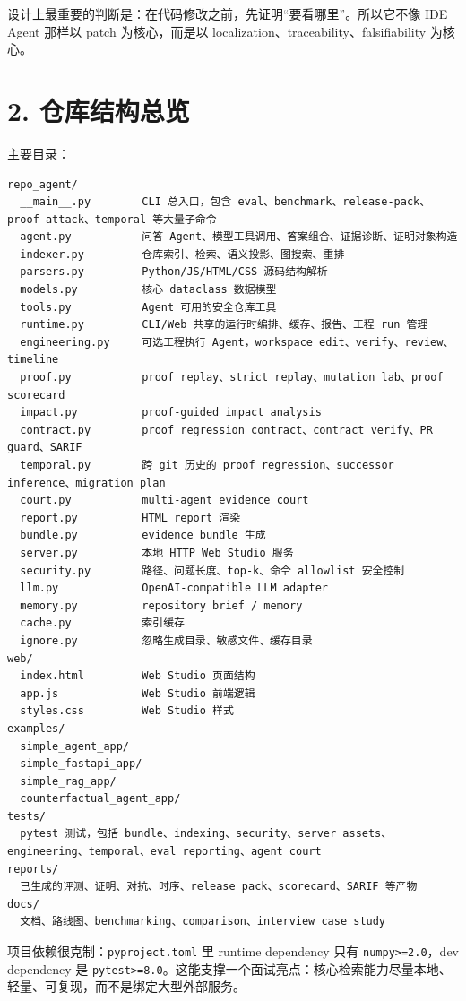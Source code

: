 \documentclass[UTF8,12pt,openany]{ctexbook}
\begin{document}
设计上最重要的判断是：在代码修改之前，先证明“要看哪里”。所以它不像 IDE Agent 那样以 patch 为核心，而是以 localization、traceability、falsifiability 为核心。\par

\section{2. 仓库结构总览}

主要目录：\par

\begin{lstlisting}
repo_agent/
  __main__.py        CLI 总入口，包含 eval、benchmark、release-pack、proof-attack、temporal 等大量子命令
  agent.py           问答 Agent、模型工具调用、答案组合、证据诊断、证明对象构造
  indexer.py         仓库索引、检索、语义投影、图搜索、重排
  parsers.py         Python/JS/HTML/CSS 源码结构解析
  models.py          核心 dataclass 数据模型
  tools.py           Agent 可用的安全仓库工具
  runtime.py         CLI/Web 共享的运行时编排、缓存、报告、工程 run 管理
  engineering.py     可选工程执行 Agent，workspace edit、verify、review、timeline
  proof.py           proof replay、strict replay、mutation lab、proof scorecard
  impact.py          proof-guided impact analysis
  contract.py        proof regression contract、contract verify、PR guard、SARIF
  temporal.py        跨 git 历史的 proof regression、successor inference、migration plan
  court.py           multi-agent evidence court
  report.py          HTML report 渲染
  bundle.py          evidence bundle 生成
  server.py          本地 HTTP Web Studio 服务
  security.py        路径、问题长度、top-k、命令 allowlist 安全控制
  llm.py             OpenAI-compatible LLM adapter
  memory.py          repository brief / memory
  cache.py           索引缓存
  ignore.py          忽略生成目录、敏感文件、缓存目录
web/
  index.html         Web Studio 页面结构
  app.js             Web Studio 前端逻辑
  styles.css         Web Studio 样式
examples/
  simple_agent_app/
  simple_fastapi_app/
  simple_rag_app/
  counterfactual_agent_app/
tests/
  pytest 测试，包括 bundle、indexing、security、server assets、engineering、temporal、eval reporting、agent court
reports/
  已生成的评测、证明、对抗、时序、release pack、scorecard、SARIF 等产物
docs/
  文档、路线图、benchmarking、comparison、interview case study
\end{lstlisting}

项目依赖很克制：\texttt{pyproject.toml} 里 runtime dependency 只有 \texttt{numpy>=2.0}，dev dependency 是 \texttt{pytest>=8.0}。这能支撑一个面试亮点：核心检索能力尽量本地、轻量、可复现，而不是绑定大型外部服务。\par
\end{document}

